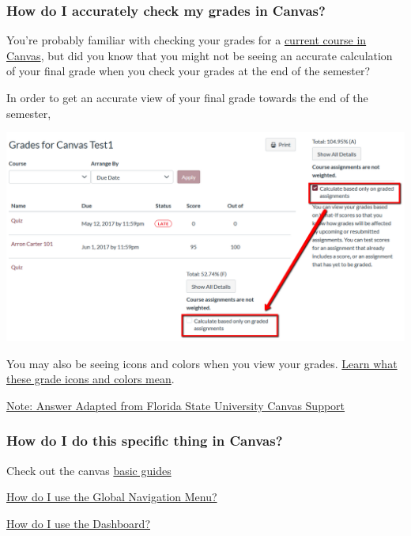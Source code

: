 \hypertarget{how-do-i-accurately-check-my-grades-in-canvas}{%
\subsubsection{How do I accurately check my grades in Canvas?}\label{how-do-i-accurately-check-my-grades-in-canvas}}

You're probably familiar with checking your grades for a \href{https://community.canvaslms.com/t5/Student-Guide/How-do-I-view-my-grades-in-a-current-course/ta-p/493}{current course in Canvas}, but did you know that you might not be seeing an accurate calculation of your final grade when you check your grades at the end of the semester?

In order to get an accurate view of your final grade towards the end of the semester,

\begin{center}\includegraphics[width=0.5\linewidth]{img/grades} \end{center}

You may also be seeing icons and colors when you view your grades. \href{https://community.canvaslms.com/docs/DOC-16533-4212829283}{Learn what these grade icons and colors mean}.

\href{https://support.canvas.fsu.edu/kb/article/1068-students-make-sure-you-are-seeing-the-right-grades-in-canvas/}{Note: Answer Adapted from Florida State University Canvas Support}

\hypertarget{how-do-i-do-this-specific-thing-in-canvas}{%
\subsubsection{How do I do this specific thing in Canvas?}\label{how-do-i-do-this-specific-thing-in-canvas}}

Check out the canvas \href{https://community.canvaslms.com/t5/Canvas-Basics-Guide/tkb-p/basics}{basic guides}

\href{https://community.canvaslms.com/docs/DOC-10603-4212710332}{How do I use the Global Navigation Menu?}

\href{https://community.canvaslms.com/docs/DOC-10587-4212710330}{How do I use the Dashboard?}

